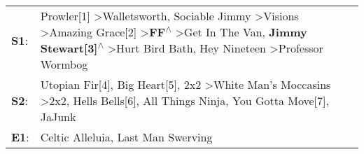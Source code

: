 \begin{supertabular}{p{0.03\textwidth}p{0.92\textwidth}}
 \textbf{S1}:  &  Prowler[1]\textsuperscript{} \textgreater \enspace Walletsworth\textsuperscript{}, \enspace Sociable Jimmy\textsuperscript{} \textgreater \enspace Visions\textsuperscript{} \textgreater \enspace Amazing Grace[2]\textsuperscript{} \textgreater \enspace \textbf{FF\textsuperscript{$\wedge$}} \textgreater \enspace Get In The Van\textsuperscript{}, \enspace \textbf{Jimmy Stewart[3]\textsuperscript{$\wedge$}} \textgreater \enspace Hurt Bird Bath\textsuperscript{}, \enspace Hey Nineteen\textsuperscript{} \textgreater \enspace Professor Wormbog\textsuperscript{}  \enspace  \\
 \textbf{S2}:  &                                                                                                                                                                                      Utopian Fir[4]\textsuperscript{}, \enspace Big Heart[5]\textsuperscript{}, \enspace 2x2\textsuperscript{} \textgreater \enspace White Man's Moccasins\textsuperscript{} \textgreater \enspace 2x2\textsuperscript{}, \enspace Hells Bells[6]\textsuperscript{}, \enspace All Things Ninja\textsuperscript{}, \enspace You Gotta Move[7]\textsuperscript{}, \enspace JaJunk\textsuperscript{}  \enspace  \\
 \textbf{E1}:  &                                                                                                                                                                                                                                                                                                                                                                                                                                                                                                   Celtic Alleluia\textsuperscript{}, \enspace Last Man Swerving\textsuperscript{}  \enspace  \\
\end{supertabular}
